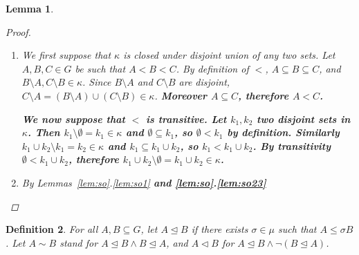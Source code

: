 \documentclass[11pt]{article}
\newcommand{\nouveau}[1]{{\small \color{blue} \bf  #1}}
\newtheorem{definition}{Definition}
\newtheorem{lemma}[definition]{Lemma}
\newcommand{\releq}{\mathrel{\trianglelefteq}}
\newcommand{\rel}{\mathrel{\triangleleft}}
\begin{document}
\begin{lemma}
\begin{proof}
\begin{enumerate}
 
  \item We first suppose that $\kappa$ is closed under disjoint union
    of any two sets.  Let $A,B,C \in G$ be such that $A < B < C$. By
    definition of $<$, $A \subseteq B \subseteq C$, and
    $B \setminus A, C \setminus B \in \kappa$. Since $B \setminus A$
    and $C \setminus B$ are disjoint,
    $C \setminus A = (B \setminus A) \cup (C \setminus B) \in
    \kappa$. \nouveau{Moreover \(A \subseteq C\), therefore
      \(A < C\).}

    \nouveau{%
      We now suppose that \(<\) is transitive. Let \(k_1, k_2\) two
      disjoint sets in \(\kappa\). Then
      \(k_1 \setminus \emptyset = k_1 \in \kappa\) and
      \(\emptyset \subseteq k_1\), so \(\emptyset < k_1\) by
      definition.  Similarly
      \(k_1 \cup k_2 \setminus k_1 = k_2 \in \kappa\) and
      \(k_1 \subseteq k_1 \cup k_2\), so \(k_1 < k_1 \cup k_2\).  By
      transitivity \(\emptyset < k_1 \cup k_2\), therefore
      \(k_1 \cup k_2 \setminus \emptyset = k_1 \cup k_2 \in \kappa\).
    }

 
  \item By Lemmas~\ref{lem:so}.\ref{lem:so1}
    \nouveau{and \ref{lem:so}.\ref{lem:so23}}
 \end{enumerate}
\end{proof}
\end{lemma}







\begin{definition}
For all $A,B \subseteq G$, let $A \releq B$ if there exists $\sigma \in \mu$ such that $A \leq \sigma B$. Let $A \sim B$ stand for $A \releq B \land B \releq A$, and $A \rel B$ for $A \releq B \land \neg(B \releq A)$.
\end{definition}
\end{document}
